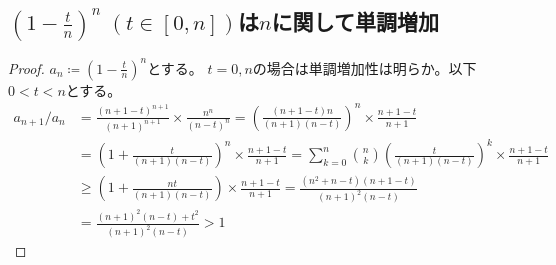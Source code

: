        \subsection{\texorpdfstring{$\left(1-\frac{t}{n}\right)^n\;(t\in[0,n])$}{(1-t/n)\string^n (t∈[0,n])}は\texorpdfstring{$n$}{n}に関して単調増加}
            \label{(1-t/n)^nは単調増加}
            \begin{proof}
                \quad\par
                $a_n \coloneq \left(1-\frac{t}{n}\right)^n$とする。
                $t=0,n$の場合は単調増加性は明らか。以下$0<t<n$とする。
                \begin{align*}
                    a_{n+1}/a_n &= \frac{(n+1-t)^{n+1}}{(n+1)^{n+1}}\times\frac{n^n}{(n-t)^n} = \left(\frac{(n+1-t)n}{(n+1)(n-t)}\right)^n\times\frac{n+1-t}{n+1} \\
                    &= \left(1 + \frac{t}{(n+1)(n-t)}\right)^n\times\frac{n+1-t}{n+1} = \sum_{k=0}^n \binom{n}{k}\left(\frac{t}{(n+1)(n-t)}\right)^k \times \frac{n+1-t}{n+1} \\
                    &\geq \left(1 + \frac{nt}{(n+1)(n-t)}\right) \times \frac{n+1-t}{n+1} = \frac{(n^2+n-t)(n+1-t)}{(n+1)^2(n-t)} \\
                    &= \frac{(n+1)^2(n-t) + t^2}{(n+1)^2(n-t)} > 1
                \end{align*}
            \end{proof}
